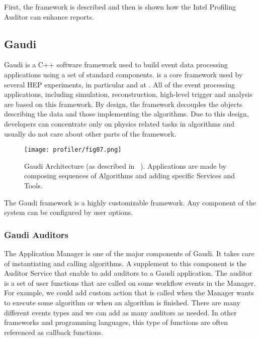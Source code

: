 First, the \gaudi framework is described and then is shown how the \gaudi Intel
Profiling Auditor can enhance \amp reports.

\subsection{Gaudi}
\label{sec:gaudi}
Gaudi is a C++ software framework used to build event data processing
applications using a set of standard components. \gaudi is a core framework used
by several HEP experiments, in particular \lhcb and \atlas at \lhc. All of the
event processing applications, including simulation, reconstruction, high-level
trigger and analysis are based on this framework. By design, the framework
decouples the objects  describing the data and those implementing the
algorithms. Due to this design,  developers can concentrate only on  physics
related tasks in algorithms and usually do not care about other parts of the
framework.

\begin{figure}[H]
\begin{minipage}{\textwidth}
\texttt{[image: profiler/fig07.png]}
\caption{\label{fig07}Gaudi Architecture (as described in
~\cite{Barrand:2001ny}). Applications are made by composing sequences of
Algorithms and adding specific Services and Tools.}
\end{minipage}
\end{figure}

The Gaudi framework is a highly customizable framework. Any component of the
system can be configured by user options.

\subsubsection{Gaudi Auditors}

The Application Manager is one of the major components of Gaudi. It takes care
of instantiating and calling algorithms. A supplement to this component  is the
Auditor Service that enable to add auditors to a Gaudi application. The auditor
is a set of user functions that are called on some workflow events in the
Manager. For example, we could add custom action that is called when the
Manager wants to execute some algorithm or when an algorithm is finished. There
are many different events types and we can add as many auditors as needed. In
other frameworks and programming languages, this type of functions are often
referenced as callback functions.

